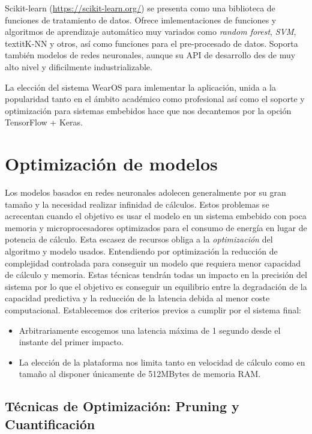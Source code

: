 Scikit-learn (\url{https://scikit-learn.org/}) se presenta como una biblioteca de funciones de tratamiento de datos. Ofrece imlementaciones de funciones y algoritmos de aprendizaje automático muy variados como \textit{random forest}, \textit{SVM}, textit{K-NN} y otros, así como funciones para el pre-procesado de datos. Soporta también modelos de redes neuronales, aunque su API de desarrollo des de muy alto nivel y dificilmente industrializable.

La elección del sistema WearOS para imlementar la aplicación, unida a la popularidad tanto en el ámbito académico como profesional así como el soporte y optimización para sistemas embebidos hace que nos decantemos por la opción TensorFlow + Keras.

\section{Optimización de modelos}\label{sec:req:optimizacion}

Los modelos basados en redes neuronales adolecen generalmente por su gran tamaño y la necesidad realizar infinidad de cálculos. Estos problemas se acrecentan cuando el objetivo es usar el modelo en un sistema embebido con poca memoria y microprocesadores optimizados para el consumo de energía en lugar de potencia de cálculo. Esta escasez de recursos obliga a la \textit{optimización} del algoritmo y modelo usados. Entendiendo por optimización la reducción de complejidad controlada para conseguir un modelo que requiera menor capacidad de cálculo y memoria. Estas técnicas tendrán todas un impacto en la precisión del sistema por lo que el objetivo es conseguir un equilibrio entre la degradación de la capacidad predictiva y la reducción de la latencia debida al menor coste computacional. Establecemos dos criterios previos a cumplir por el sistema final:

\begin{itemize}
  \item Arbitrariamente escogemos una latencia máxima de 1 segundo desde el instante del primer impacto.
  \item La elección de la plataforma nos limita tanto en velocidad de cálculo como en tamaño al disponer únicamente de 512MBytes de memoria RAM.
\end{itemize}

\subsection{Técnicas de Optimización: Pruning y Cuantificación}

